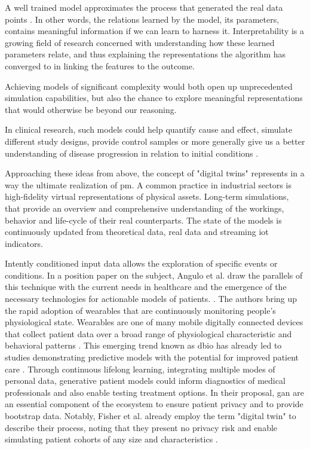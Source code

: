             A well trained model approximates the process that generated the real data points \cite{esteban2017real}. In other words, the relations learned by the model, its parameters, contains meaningful information if we can learn to harness it. Interpretability is a growing field of research concerned with understanding how these learned parameters relate, and thus explaining the representations the algorithm has converged to in linking the features to the outcome.\par
            Achieving models of significant complexity would both open up unprecedented simulation capabilities, but also the chance to explore meaningful representations that would otherwise be beyond our reasoning.\par 
            In clinical research, such models could help quantify cause and effect, simulate different study designs, provide control samples or more generally give us a better understanding of disease progression in relation to initial conditions \cite{Fisher2019, yahi2017generative, walsh2020generating}.\par
            
            Approaching these ideas from above, the concept of "digital twins" represents in a way the ultimate realization of \gls{pm}. A common practice in industrial sectors is high-fidelity virtual representations of physical assets. Long-term simulations, that provide an overview and comprehensive understanding of the workings, behavior and life-cycle of their real counterparts. The state of the models is continuously updated from theoretical data, real data and streaming \gls{iot} indicators.\par
            Intently conditioned input data allows the exploration of specific events or conditions. In a position paper on the subject, Angulo et al. draw the parallels of this technique with the current needs in healthcare and the emergence of the necessary technologies for actionable models of patients. \cite{angulo2019towards,Angulo_2020}. The authors bring up the rapid adoption of wearables that are continuously monitoring people's physiological state. 
            Wearables are one of many mobile digitally connected devices that collect patient data over a broad range of physiological characteristic and behavioral patterns \cite{coravos2019developing}. This emerging trend known as \gls{dbio} has already led to studies demonstrating predictive models with the potential for improved patient care \cite{snyder2018best}. Through continuous lifelong learning, integrating  multiple modes of personal data, generative patient models could inform diagnostics of medical professionals and also enable testing treatment options. In their proposal, \gls{gan} are an essential component of the ecosystem to ensure patient privacy and to provide bootstrap data. Notably, Fisher et al. already employ the term "digital twin" to describe their process, noting that they present no privacy risk and enable simulating patient cohorts of any size and characteristics \cite{walsh2020generating}.
        
